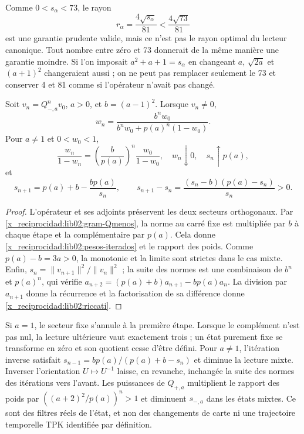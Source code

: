 Comme \(0<s_\alpha<73\), le rayon
\[
 r_\alpha=\frac{4\sqrt{s_\alpha}}{81}<\frac{4\sqrt{73}}{81}
\]
est une garantie prudente valide, mais ce n’est pas le rayon optimal du
lecteur canonique. Tout nombre entre zéro et 73 donnerait de la même manière
une garantie moindre. Si l’on imposait \(a^2+a+1=s_\alpha\) en changeant
\(a\), \(\sqrt{2a}\) et \((a+1)^2\) changeraient aussi ; on ne
peut pas remplacer seulement le 73 et conserver 4 et 81 comme si l’opérateur
n’avait pas changé.

\begin{theorem}
\label{x_reciprocidad:lib02:iteraciones}
Soit \(v_n=Q_{-,a}^nv_0\), \(a>0\), et \(b=(a-1)^2\). Lorsque \(v_n\ne0\),
\begin{equation}
 w_n=\frac{b^nw_0}{b^nw_0+p(a)^n(1-w_0)}.
 \label{x_reciprocidad:lib02:pesos-iterados}
\end{equation}
Pour \(a\ne1\) et \(0<w_0<1\),
\[
 \frac{w_n}{1-w_n}
 =\left(\frac b{p(a)}\right)^n\frac{w_0}{1-w_0},
 \quad w_n\downarrow0,\quad s_n\uparrow p(a),
\]
et
\begin{equation}
 s_{n+1}=p(a)+b-\frac{bp(a)}{s_n},\qquad
 s_{n+1}-s_n=\frac{(s_n-b)(p(a)-s_n)}{s_n}>0.
 \label{x_reciprocidad:lib02:riccati}
\end{equation}
\end{theorem}
\begin{proof}
L’opérateur et ses adjoints préservent les deux secteurs orthogonaux. Par
\eqref{x_reciprocidad:lib02:gram-Qmenos}, la norme au carré fixe est multipliée par
\(b\) à chaque étape et la complémentaire par \(p(a)\). Cela donne
\eqref{x_reciprocidad:lib02:pesos-iterados} et le rapport des poids. Comme
\(p(a)-b=3a>0\), la monotonie et la limite sont strictes dans le cas
mixte. Enfin,
\(s_n=\|v_{n+1}\|^2/\|v_n\|^2\) ; la suite des normes est
une combinaison de \(b^n\) et \(p(a)^n\), qui vérifie
\(a_{n+2}=(p(a)+b)a_{n+1}-bp(a)a_n\). La division par
\(a_{n+1}\) donne la récurrence et la factorisation de sa différence donne
\eqref{x_reciprocidad:lib02:riccati}.
\end{proof}

Si \(a=1\), le secteur fixe s'annule à la première étape. Lorsque le complément n'est pas nul, la lecture ultérieure vaut exactement trois ; un état purement fixe se transforme en zéro et son quotient cesse d'être défini. Pour \(a\ne1\), l'itération inverse satisfait \(s_{n-1}=bp(a)/(p(a)+b-s_n)\) et diminue la lecture mixte. Inverser l'orientation \(U\mapsto U^{-1}\) laisse, en revanche, inchangée la suite des normes des itérations vers l'avant. Les puissances de \(Q_{+,a}\) multiplient le rapport des poids par \(((a+2)^2/p(a))^n>1\) et diminuent \(s_{-,a}\) dans les états mixtes. Ce sont des filtres réels de l'état, et non des changements de carte ni une trajectoire temporelle TPK identifiée par définition.

